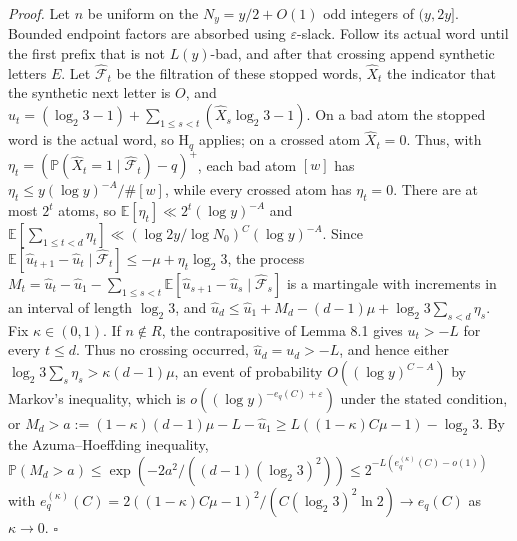 \documentclass[11pt,a4paper]{article}
\begin{document}
\emph{Proof.} Let \(n\) be uniform on the \(N_y=y/2+O(1)\) odd integers
of \((y,2y]\). Bounded endpoint factors are absorbed using
\(\varepsilon\)-slack. Follow its actual word until the first prefix
that is not \(L(y)\)-bad, and after that crossing append synthetic
letters \(E\). Let \(\widehat{\mathcal F}_t\) be the filtration of these
stopped words, \(\widehat X_t\) the indicator that the synthetic next
letter is \(O\), and \(\widehat u_t=(\log_2 3-1)+
\sum_{1\le s<t}(\widehat X_s\log_2 3-1)\). On a bad atom the stopped
word is the actual word, so \(\mathrm H_q\) applies; on a crossed atom
\(\widehat X_t=0\). Thus, with
\(\eta_t=(\mathbb P(\widehat X_t=1\mid\widehat{\mathcal F}_t)-q)^+\),
each bad atom \([w]\) has \(\eta_t\le y(\log y)^{-A}/\#[w]\), while
every crossed atom has \(\eta_t=0\). There are at most \(2^t\) atoms, so
\(\mathbb E[\eta_t]\ll 2^t(\log y)^{-A}\) and
\(\mathbb E[\sum_{1\le t<d}\eta_t]\ll (\log 2y/\log N_0)^{C}(\log y)^{-A}\).
Since
\(\mathbb E[\widehat u_{t+1}-\widehat u_t\mid\widehat{\mathcal F}_t]
\le-\mu+\eta_t\log_2 3\), the process \(M_t=\widehat u_t-\widehat u_1-
\sum_{1\le s<t}\mathbb E[\widehat u_{s+1}-\widehat u_s
\mid\widehat{\mathcal F}_s]\) is a martingale with increments in an
interval of length \(\log_2 3\), and
\(\widehat u_d\le \widehat u_1+M_d-(d-1)\mu+
\log_2 3\sum_{s<d}\eta_s\). Fix \(\kappa\in(0,1)\). If \(n\notin R\),
the contrapositive of Lemma 8.1 gives \(u_t>-L\) for every \(t\le d\).
Thus no crossing occurred, \(\widehat u_d=u_d>-L\), and hence either
\(\log_2 3\sum_s\eta_s>\kappa(d-1)\mu\), an event of probability
\(O((\log y)^{C-A})\) by Markov's inequality, which is
\(o((\log y)^{-e_q(C)+\varepsilon})\) under the stated condition, or
\(M_d>a:=(1-\kappa)(d-1)\mu-L-\widehat u_1
\ge L((1-\kappa)C\mu-1)-\log_2 3\). By the Azuma--Hoeffding inequality,
\(\mathbb P(M_d>a)\le\exp(-2a^2/((d-1)(\log_2 3)^2))\le 2^{-L(e_q^{(\kappa)}(C)-o(1))}\)
with
\(e_q^{(\kappa)}(C)=2((1-\kappa)C\mu-1)^2/(C(\log_2 3)^2\ln 2)\to e_q(C)\)
as \(\kappa\to 0\). \(\square\)
\end{document}
